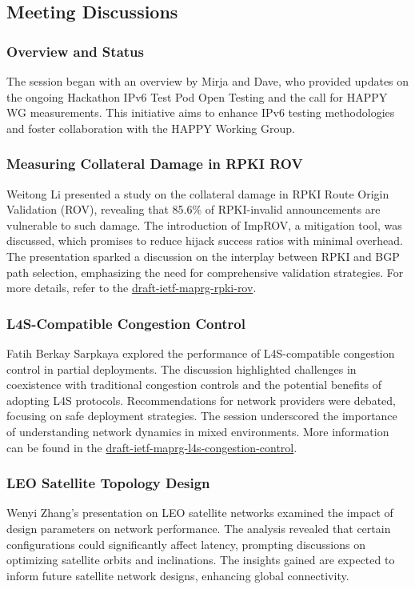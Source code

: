 \documentclass{article}
\begin{document}
\subsection{Meeting Discussions}

\subsubsection{Overview and Status}
The session began with an overview by Mirja and Dave, who provided updates on the ongoing Hackathon IPv6 Test Pod Open Testing and the call for HAPPY WG measurements. This initiative aims to enhance IPv6 testing methodologies and foster collaboration with the HAPPY Working Group.

\subsubsection{Measuring Collateral Damage in RPKI ROV}
Weitong Li presented a study on the collateral damage in RPKI Route Origin Validation (ROV), revealing that 85.6\% of RPKI-invalid announcements are vulnerable to such damage. The introduction of ImpROV, a mitigation tool, was discussed, which promises to reduce hijack success ratios with minimal overhead. The presentation sparked a discussion on the interplay between RPKI and BGP path selection, emphasizing the need for comprehensive validation strategies. For more details, refer to the \href{https://datatracker.ietf.org/doc/html/draft-ietf-maprg-rpki-rov}{draft-ietf-maprg-rpki-rov}.

\subsubsection{L4S-Compatible Congestion Control}
Fatih Berkay Sarpkaya explored the performance of L4S-compatible congestion control in partial deployments. The discussion highlighted challenges in coexistence with traditional congestion controls and the potential benefits of adopting L4S protocols. Recommendations for network providers were debated, focusing on safe deployment strategies. The session underscored the importance of understanding network dynamics in mixed environments. More information can be found in the \href{https://datatracker.ietf.org/doc/html/draft-ietf-maprg-l4s-congestion-control}{draft-ietf-maprg-l4s-congestion-control}.

\subsubsection{LEO Satellite Topology Design}
Wenyi Zhang's presentation on LEO satellite networks examined the impact of design parameters on network performance. The analysis revealed that certain configurations could significantly affect latency, prompting discussions on optimizing satellite orbits and inclinations. The insights gained are expected to inform future satellite network designs, enhancing global connectivity.
\end{document}
